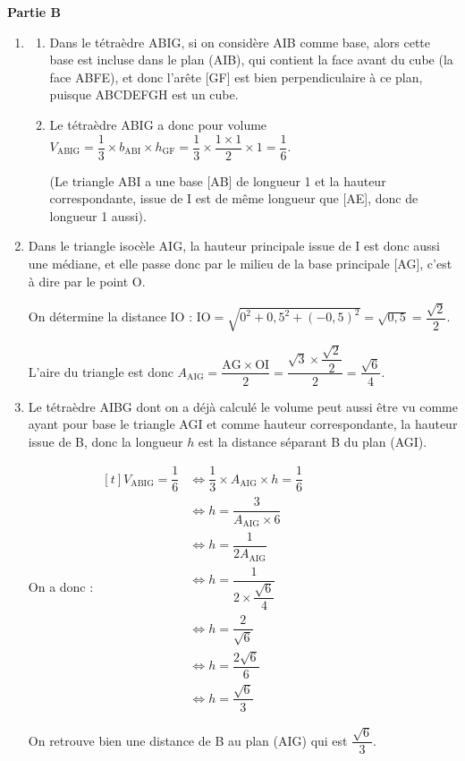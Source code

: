 		\textbf{Partie B}
		\begin{enumerate}
			\item \begin{enumerate}
				\item Dans le tétraèdre ABIG, si on considère AIB comme base, alors cette base est incluse dans le plan (AIB), qui contient la face avant du cube (la face ABFE), et donc l'arête [GF] est bien perpendiculaire à ce plan, puisque ABCDEFGH est un cube.
				\item Le tétraèdre ABIG a donc pour volume $V_{\mathrm{ABIG}} = \dfrac{1}{3} \times b_{\mathrm{ABI}} \times h_{\mathrm{GF}} = \dfrac{1}{3} \times \dfrac{1 \times 1}{2} \times 1 = \dfrac{1}{6}$.

(Le triangle ABI a une base [AB] de longueur 1 et la hauteur correspondante, issue de I est de même longueur que [AE], donc de longueur 1 aussi).
	\end{enumerate}

\item Dans le triangle isocèle AIG, la hauteur principale issue de I est donc aussi une médiane, et elle passe donc par le milieu de la base principale [AG], c'est à dire par le point O.

On détermine la distance IO : $\mathrm{IO} = \sqrt{0^2 + 0,5^2 + (-0,5)^2} = \sqrt{0,5} = \dfrac{\sqrt{2}}{2}$.

L'aire du triangle est donc $A_\mathrm{AIG} = \dfrac{\mathrm{AG} \times \mathrm{OI}}{2} = \dfrac{\sqrt{3}\times \dfrac{\sqrt{2}}{2}}{2} = \dfrac{\sqrt{6}}{4}$.

\item Le tétraèdre AIBG dont on a déjà calculé le volume peut aussi être vu comme ayant pour base le triangle AGI et comme hauteur correspondante, la hauteur issue de B, donc la longueur $h$ est la distance séparant B du plan (AGI).

On a donc : $\begin{aligned}[t] V_\mathrm{ABIG} = \dfrac{1}{6} &\iff \dfrac{1}{3}\times A_\mathrm{AIG} \times h = \dfrac{1}{6}\\
			&\iff h = \dfrac{3}{A_\mathrm{AIG}\times 6 }\\
			&\iff h = \dfrac{1}{2A_\mathrm{AIG}}\\
			&\iff h = \dfrac{1}{2\times \dfrac{\sqrt{6}}{4}}\\
			&\iff h = \dfrac{2}{\sqrt{6}}\\
			&\iff h = \dfrac{2\sqrt{6}}{6}\\
			&\iff h = \dfrac{\sqrt{6}}{3}
			\end{aligned}$

On retrouve bien une distance de B au plan (AIG) qui est $ \dfrac{\sqrt{6}}{3} $.
\end{enumerate}
